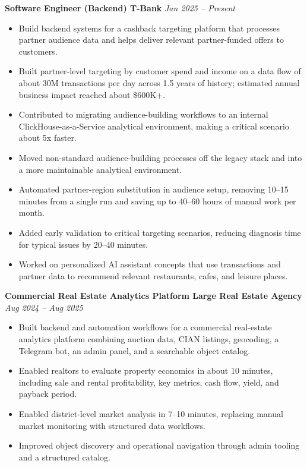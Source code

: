 \documentclass[10pt,a4paper]{article}
\begin{document}
\textbf{Software Engineer (Backend) \textbar{} T-Bank} \hfill \textit{Jan 2025 -- Present}
\begin{itemize}
  \item Build backend systems for a cashback targeting platform that processes partner audience data and helps deliver relevant partner-funded offers to customers.
  \item Built partner-level targeting by customer spend and income on a data flow of about 30M transactions per day across 1.5 years of history; estimated annual business impact reached about \$600K+.
  \item Contributed to migrating audience-building workflows to an internal ClickHouse-as-a-Service analytical environment, making a critical scenario about 5x faster.
  \item Moved non-standard audience-building processes off the legacy stack and into a more maintainable analytical environment.
  \item Automated partner-region substitution in audience setup, removing 10--15 minutes from a single run and saving up to 40--60 hours of manual work per month.
  \item Added early validation to critical targeting scenarios, reducing diagnosis time for typical issues by 20--40 minutes.
  \item Worked on personalized AI assistant concepts that use transactions and partner data to recommend relevant restaurants, cafes, and leisure places.
\end{itemize}

\textbf{Commercial Real Estate Analytics Platform \textbar{} Large Real Estate Agency} \hfill \textit{Aug 2024 -- Aug 2025}
\begin{itemize}
  \item Built backend and automation workflows for a commercial real-estate analytics platform combining auction data, CIAN listings, geocoding, a Telegram bot, an admin panel, and a searchable object catalog.
  \item Enabled realtors to evaluate property economics in about 10 minutes, including sale and rental profitability, key metrics, cash flow, yield, and payback period.
  \item Enabled district-level market analysis in 7--10 minutes, replacing manual market monitoring with structured data workflows.
  \item Improved object discovery and operational navigation through admin tooling and a structured catalog.
\end{itemize}
\end{document}
